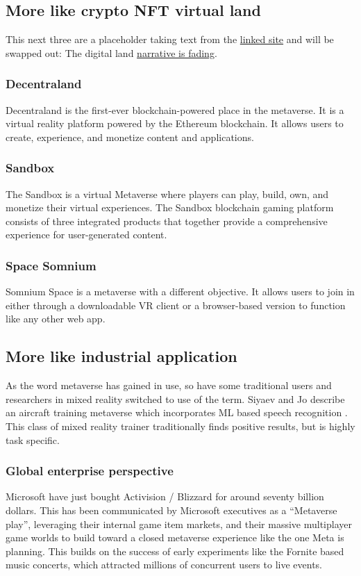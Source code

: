 \subsection{More like crypto NFT virtual land}
This next three are a placeholder taking text from the \href{https://www.analyticsinsight.net/top-10-metaverse-platforms-that-will-replace-social-media-in-future/}{linked site} and will be swapped out:
The digital land \href{https://www.coindesk.com/markets/2022/04/06/metaverse-majors-struggle-as-user-base-falls-short-of-market-expectations/?}{narrative is fading}.
\subsubsection{Decentraland}
Decentraland is the first-ever blockchain-powered place in the metaverse. It is a virtual reality platform powered by the Ethereum blockchain. It allows users to create, experience, and monetize content and applications.
\subsubsection{Sandbox}
The Sandbox is a virtual Metaverse where players can play, build, own, and monetize their virtual experiences. The Sandbox blockchain gaming platform consists of three integrated products that together provide a comprehensive experience for user-generated content.
\subsubsection{Space Somnium}  
Somnium Space is a metaverse with a different objective. It allows users to join in either through a downloadable VR client or a browser-based version to function like any other web app.
\subsection{More like industrial application}
As the word metaverse has gained in use, so have some traditional users and researchers in mixed reality switched to use of the term.
Siyaev and Jo describe an aircraft training metaverse which incorporates ML based speech recognition \cite{siyaev2021towards}. This class of mixed reality trainer traditionally finds positive results, but is highly task specific.   
 \subsubsection{Global enterprise perspective}
Microsoft have just bought Activision / Blizzard for around seventy billion dollars. This has been communicated by Microsoft executives as a ``Metaverse play'', leveraging their internal game item markets, and their massive multiplayer game worlds to build toward a closed metaverse experience like the one Meta is planning.
This builds on the success of early experiments like the Fornite based music concerts, which attracted millions of concurrent users to live events.

